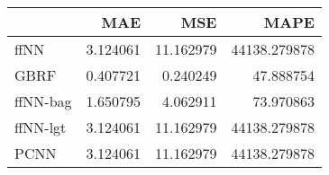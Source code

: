 \begin{tabular}{lrrr}
\toprule
{} &       MAE &        MSE &          MAPE \\
\midrule
ffNN     &  3.124061 &  11.162979 &  44138.279878 \\
GBRF     &  0.407721 &   0.240249 &     47.888754 \\
ffNN-bag &  1.650795 &   4.062911 &     73.970863 \\
ffNN-lgt &  3.124061 &  11.162979 &  44138.279878 \\
PCNN     &  3.124061 &  11.162979 &  44138.279878 \\
\bottomrule
\end{tabular}
